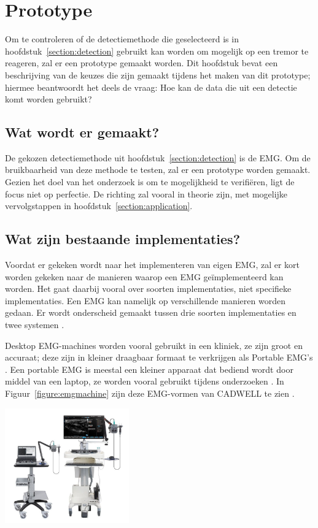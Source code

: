 \section{Prototype}
\label{section:prototyping}

Om te controleren of de detectiemethode die geselecteerd is in hoofdstuk~\ref{section:detection}
gebruikt kan worden om mogelijk op een tremor te reageren,
zal er een prototype gemaakt worden.
Dit hoofdstuk bevat een beschrijving van de keuzes die zijn gemaakt tijdens het maken van dit prototype;
hiermee beantwoordt het deels de vraag: Hoe kan de data die uit een detectie komt worden gebruikt?

\subsection{Wat wordt er gemaakt?}

De gekozen detectiemethode uit hoofdstuk~\ref{section:detection} is de EMG.
Om de bruikbaarheid van deze methode te testen, zal er een prototype worden gemaakt.
Gezien het doel van het onderzoek is om te mogelijkheid te verifiëren, ligt de focus niet op perfectie.
De richting zal vooral in theorie zijn, met mogelijke vervolgstappen in hoofdstuk~\ref{section:application}.

\subsection{Wat zijn bestaande implementaties?}

Voordat er gekeken wordt naar het implementeren van eigen EMG,
zal er kort worden gekeken naar de manieren waarop een EMG geïmplementeerd kan worden.
Het gaat daarbij vooral over soorten implementaties, niet specifieke implementaties. 
Een EMG kan namelijk op verschillende manieren worden gedaan.
Er wordt onderscheid gemaakt tussen drie soorten implementaties en twee systemen \cite{gohel2020}.

Desktop EMG-machines worden vooral gebruikt in een kliniek, ze zijn groot en accuraat;
deze zijn in kleiner draagbaar formaat te verkrijgen als Portable EMG's \cite{neurostyle2021,cadwell2023}.
Een portable EMG is meestal een kleiner apparaat dat bediend wordt door middel van een laptop,
ze worden vooral gebruikt tijdens onderzoeken \cite{neurostyle2021}.
In Figuur~\ref{figure:emgmachine} zijn deze EMG-vormen van CADWELL te zien \cite{cadwell2023}.

\begin{center}
    \includegraphics[width=0.4\textwidth]{./graphics/img-emgcarts.jpg}
    \label{figure:emgmachine}
\end{center}

